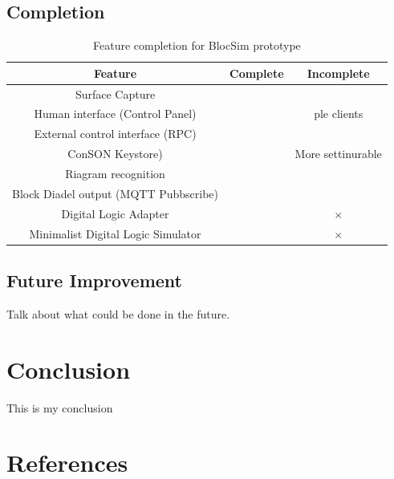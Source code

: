 \documentclass[titlesmallcaps, examinerscopy, copyrightpage]{uqthesis}
\newcommand{\tick}{\checkmark}
\newcommand{\gtick}{\color{ForestGreen} \tick }
\newcommand{\cross}{$\times$ }
\newcommand{\rcross}{\color{red} \cross }
\begin{document}
\section{Completion}



\begin{table}[ht!]
	\center
	\begin{tabular}{|c|c|c|}
		\hline
		Feature & Complete & Incomplete \\
		\hline
		Surface Capture & \gtick & \\
		Human interface (Control Panel) & \gtick & ple clients \\
		External control interface (RPC) & \gtick & \\
		ConSON Keystore) & \gtick & More settinurable \\
		Riagram recognition & \gtick & \\
		Block Diadel output \newline (MQTT Pubbscribe) & \gtick & \\
		Digital Logic Adapter & & \rcross \\
		Minimalist Digital Logic Simulator & & \rcross \\
		\hline
	\end{tabular}
	\caption{Feature completion for BlocSim prototype}
	\label{tab:completion}
\end{table} 

\newpage



\section{Future Improvement}

Talk about what could be done in the future.

\chapter{Conclusion}

 This is my conclusion




























\chapter*{References}
\begingroup
{}
\renewcommand{\addcontentsline}[3]{}
\renewcommand{\chapter}[2]{}

\endgroup


\end{document}
